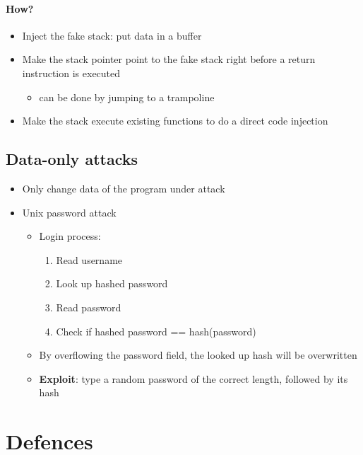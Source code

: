 \documentclass[12pt,titlepage,a4paper]{report}
\begin{document}
				\paragraph{How?}
				\begin{itemize}
					\item Inject the fake stack: put data in a buffer
					\item Make the stack pointer point to the fake stack right before a return instruction is executed
					\begin{itemize}
						\item can be done by jumping to a trampoline
					\end{itemize}
					\item Make the stack execute existing functions to do a direct code injection
				\end{itemize}
			
			\subsection{Data-only attacks}
				\begin{itemize}
					\item Only change data of the program under attack
					\item Unix password attack
					\begin{itemize}
						\item Login process:
						\begin{enumerate}
							\item Read username
							\item Look up hashed password
							\item Read password
							\item Check if hashed password == hash(password)
						\end{enumerate}
						\item By overflowing the password field, the looked up hash will be overwritten
						\item \textbf{Exploit}: type a random password of the correct length, followed by its hash
					\end{itemize}
				\end{itemize}

		\section{Defences}
\end{document}
